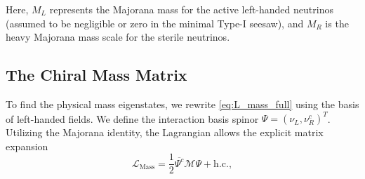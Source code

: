 Here, $M_L$ represents the Majorana mass for the active left-handed neutrinos
(assumed to be negligible or zero in the minimal Type-I seesaw), and $M_R$ is
the heavy Majorana mass scale for the sterile neutrinos.

\subsection{The Chiral Mass Matrix}

To find the physical mass eigenstates, we rewrite \eqref{eq:L_mass_full} using
the basis of left-handed fields. We define the interaction basis spinor $\Psi =
\left(\nu_L, \nu_R^c\right)^T$. Utilizing the Majorana identity, the Lagrangian
allows the explicit matrix expansion
\begin{equation}
  \mathcal{L}_{\text{Mass}} = \frac{1}{2} \overline{\Psi^c} \mathcal{M} \Psi +
  \text{h.c.},
\end{equation}

